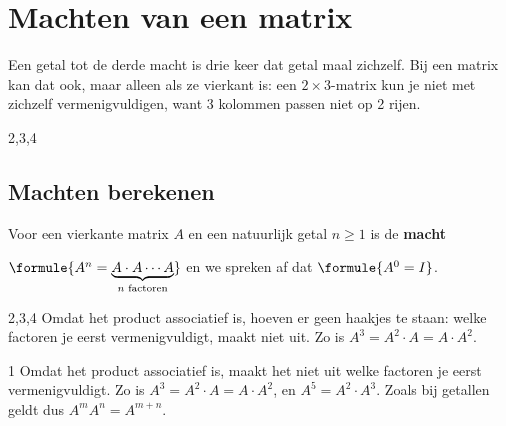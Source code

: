 \begin{oefeningen}
\end{oefeningen}

\section{Machten van een matrix}

Een getal tot de derde macht is drie keer dat getal maal zichzelf. Bij een matrix kan dat ook, maar alleen als ze vierkant is: een $2 \times 3$-matrix kun je niet met zichzelf vermenigvuldigen, want 3 kolommen passen niet op 2 rijen.

\begin{alleenvoor}{2,3,4}
\subsection{Machten berekenen}

\end{alleenvoor}
\begin{theorie}
Voor een vierkante matrix $A$ en een natuurlijk getal $n \geqslant 1$ is de \textbf{\textcolor{accent}{macht}}

\vspace{1mm}
\qquad $\formule{A^n = \underbrace{A \cdot A \cdots A}_{n \text{ factoren}}}$ \qquad en we spreken af dat $\formule{A^0 = I}$.
\end{theorie}

\begin{alleenvoor}{2,3,4}
Omdat het product associatief is, hoeven er geen haakjes te staan: welke factoren je eerst vermenigvuldigt, maakt niet uit. Zo is $A^3 = A^2 \cdot A = A \cdot A^2$.
\end{alleenvoor}
\begin{alleenvoor}{1}
Omdat het product associatief is, maakt het niet uit welke factoren je eerst vermenigvuldigt. Zo is $A^3 = A^2 \cdot A = A \cdot A^2$, en $A^5 = A^2 \cdot A^3$. Zoals bij getallen geldt dus $A^m A^n = A^{m+n}$.
\end{alleenvoor}

